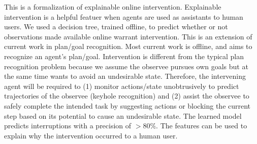 

%

This is a formalization of explainable online intervention. 
Explainable intervention is a helpful featuer when agents are used as assistants to human users.
We used a decision tree, trained offline, to predict whether or not observations made available online warrant intervention. This is an extension of current work in plan/goal recognition. Most current work is offline, and aims to recognize an agent's plan/goal. Intervention is different from the typical plan recognition problem because we assume the observee pursues own goals but at the same time wants to avoid an undesirable state. Therefore, the intervening agent will be required to (1) monitor actions/state unobtrusively to predict trajectories of the observee (keyhole recognition) and (2) assist the observee to safely complete the intended task by suggesting actions or blocking the current step based on its potential to cause an undesirable state.
The learned model predicts interruptions with a precision of $>80\%$. The features can be used to explain why the intervention occurred to a human user.

